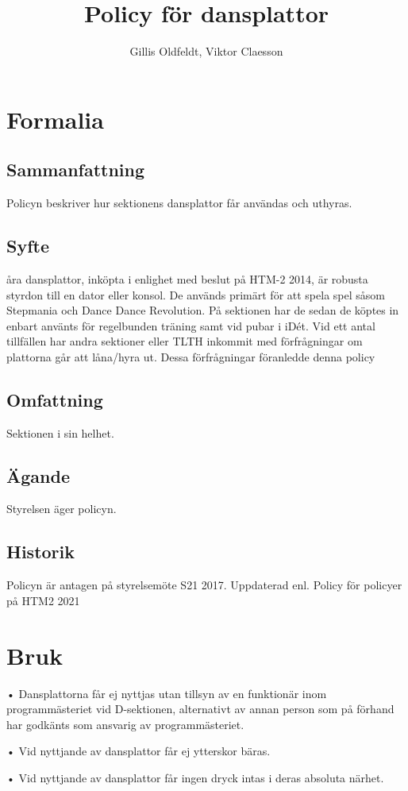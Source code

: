 \documentclass{dsekprotokoll}
\title{Policy för dansplattor}
\author{Gillis Oldfeldt, Viktor Claesson}
\begin{document}
\maketitle
\section{Formalia}
\subsection{Sammanfattning}
Policyn beskriver hur sektionens dansplattor får användas och uthyras.
\subsection{Syfte}
åra dansplattor, inköpta i enlighet med beslut på HTM-2 2014, är robusta styrdon till en dator
eller konsol. De används primärt för att spela spel såsom Stepmania och Dance Dance Revolution. På sektionen har de sedan de köptes in enbart använts för regelbunden träning samt vid
pubar i iDét. Vid ett antal tillfällen har andra sektioner eller TLTH inkommit med förfrågningar
om plattorna går att låna/hyra ut. Dessa förfrågningar föranledde denna policy

\subsection{Omfattning}
Sektionen i sin helhet.
\subsection{Ägande}
Styrelsen äger policyn.
\subsection{Historik}
Policyn är antagen på styrelsemöte S21 2017.
Uppdaterad enl. Policy för policyer på HTM2 2021

\section{Bruk}
• Dansplattorna får ej nyttjas utan tillsyn av en funktionär inom programmästeriet vid D-sektionen, alternativt av annan person som på förhand har godkänts som ansvarig av
programmästeriet.


• Vid nyttjande av dansplattor får ej ytterskor bäras.


• Vid nyttjande av dansplattor får ingen dryck intas i deras absoluta närhet.
\end{document}
